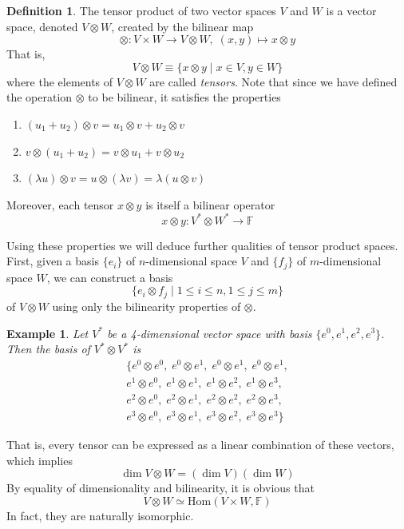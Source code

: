 \documentclass{article}
\newtheorem{example}{Example}[section]
\theoremstyle{remark}
\theoremstyle{definition}
\newtheorem{definition}{Definition}[section]
\begin{document}
    \begin{definition}
    The tensor product of two vector spaces $V$ and $W$ is a vector space, denoted $V \otimes W$, created by the bilinear map 
    \[\otimes: V \times W \longrightarrow V \otimes W, \; (x, y) \mapsto x \otimes y\]
    That is, 
    \[V \otimes W \equiv \{ x \otimes y \; | \; x \in V, y \in W\} \]
    where the elements of $V \otimes W$ are called \textit{tensors}. Note that since we have defined the operation $\otimes$ to be bilinear, it satisfies the properties
    \begin{enumerate}
        \item $(u_1 + u_2) \otimes v = u_1 \otimes v + u_2 \otimes v$
        \item $v \otimes (u_1 + u_2) = v \otimes u_1 + v \otimes u_2$
        \item $(\lambda u) \otimes v = u \otimes (\lambda v) = \lambda (u \otimes v)$ 
    \end{enumerate}
    Moreover, each tensor $x \otimes y$ is itself a bilinear operator
    \[x \otimes y: V^* \otimes W^* \longrightarrow \mathbb{F}\]
    \end{definition}

    Using these properties we will deduce further qualities of tensor product spaces. First, given a basis $\{e_i\}$ of $n$-dimensional space $V$ and $\{f_j\}$ of $m$-dimensional space $W$, we can construct a basis 
    \[\{e_i \otimes f_j \; | \; 1 \leq i \leq n, 1 \leq j \leq m\}\]
    of $V \otimes W$ using only the bilinearity properties of $\otimes$. 

    \begin{example}
    Let $V^*$ be a 4-dimensional vector space with basis $\{ e^0, e^1, e^2, e^3\}$. Then the basis of $V^* \otimes V^*$ is
    \begin{align*} 
    \{e^0 \otimes e^0, \; e^0 \otimes e^1, \;e^0 \otimes e^1, \;e^0 \otimes e^1, \\
    e^1 \otimes e^0,\; e^1 \otimes e^1,\; e^1 \otimes e^2,\; e^1 \otimes e^3, \\
    e^2 \otimes e^0,\; e^2 \otimes e^1,\; e^2 \otimes e^2,\; e^2 \otimes e^3, \\
    e^3 \otimes e^0,\; e^3 \otimes e^1,\; e^3 \otimes e^2,\; e^3 \otimes e^3\}
    \end{align*}
    \end{example}

    That is, every tensor can be expressed as a linear combination of these vectors, which implies
    \[\dim{V \otimes W} = (\dim{V}) (\dim{W})\]
    By equality of dimensionality and bilinearity, it is obvious that
    \[V \otimes W \simeq \text{Hom}(V \times W, \mathbb{F})\]
    In fact, they are naturally isomorphic. 
\end{document}
